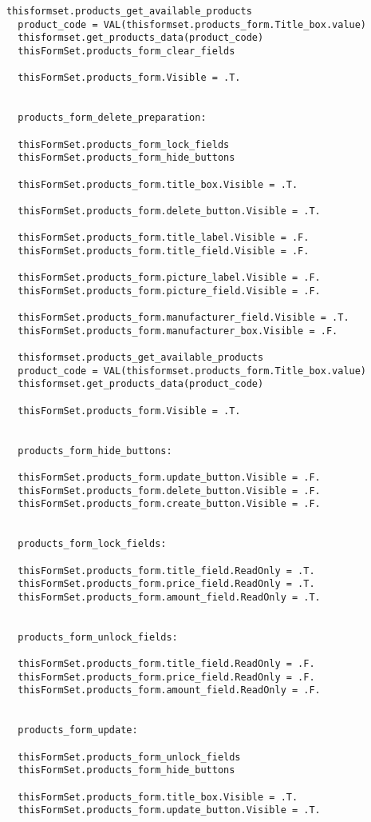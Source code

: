 \begin{lstlisting}[caption=crud\_formset\_procedures]
  thisformset.products_get_available_products
  product_code = VAL(thisformset.products_form.Title_box.value)
  thisformset.get_products_data(product_code)
  thisFormSet.products_form_clear_fields

  thisFormSet.products_form.Visible = .T.


  products_form_delete_preparation:

  thisFormSet.products_form_lock_fields
  thisFormSet.products_form_hide_buttons

  thisFormSet.products_form.title_box.Visible = .T.

  thisFormSet.products_form.delete_button.Visible = .T.

  thisFormSet.products_form.title_label.Visible = .F.
  thisFormSet.products_form.title_field.Visible = .F.

  thisFormSet.products_form.picture_label.Visible = .F.
  thisFormSet.products_form.picture_field.Visible = .F.

  thisFormSet.products_form.manufacturer_field.Visible = .T.
  thisFormSet.products_form.manufacturer_box.Visible = .F.

  thisformset.products_get_available_products
  product_code = VAL(thisformset.products_form.Title_box.value)
  thisformset.get_products_data(product_code)

  thisFormSet.products_form.Visible = .T.


  products_form_hide_buttons:

  thisFormSet.products_form.update_button.Visible = .F.
  thisFormSet.products_form.delete_button.Visible = .F.
  thisFormSet.products_form.create_button.Visible = .F.


  products_form_lock_fields:

  thisFormSet.products_form.title_field.ReadOnly = .T.
  thisFormSet.products_form.price_field.ReadOnly = .T.
  thisFormSet.products_form.amount_field.ReadOnly = .T.


  products_form_unlock_fields:

  thisFormSet.products_form.title_field.ReadOnly = .F.
  thisFormSet.products_form.price_field.ReadOnly = .F.
  thisFormSet.products_form.amount_field.ReadOnly = .F.


  products_form_update:

  thisFormSet.products_form_unlock_fields
  thisFormSet.products_form_hide_buttons

  thisFormSet.products_form.title_box.Visible = .T.
  thisFormSet.products_form.update_button.Visible = .T.


\end{lstlisting}
